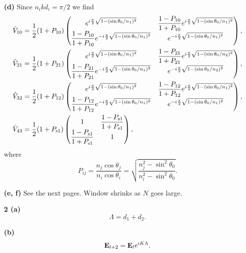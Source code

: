 \documentclass{article}
\makeatletter
\newcommand*{\shifttext}[1]{%
  \settowidth{\@tempdima}{#1}%
  \hspace{-\@tempdima}#1%
}
\newcommand{\plabel}[1]{%
\shifttext{\textbf{#1}\quad}%
}
\newcommand{\prule}{%
\begin{center}%
\hdashrule[0.5ex]{.99\linewidth}{1pt}{1pt 2.5pt}%
\end{center}%
}
\newcommand{\minusbaseline}{\abovedisplayskip=0pt\abovedisplayshortskip=0pt~\vspace*{-\baselineskip}}%
\makeatother
\begin{document}
\plabel{(d)}%
Since $n_i k d_i = \pi/2$ we find
\begin{align*}
    \hat{V}_{10} &= \frac{1}{2}\qty(1+P_{10}) \begin{pmatrix}
        e^{i\frac{\pi}{2}\sqrt{1-(\sin\theta_0/n_1)^2}} & \dfrac{1-P_{10}}{1+P_{10}} e^{i\frac{\pi}{2}\sqrt{1-(\sin\theta_0/n_1)^2}}
        \\
        \dfrac{1-P_{10}}{1+P_{10}} e^{-i\frac{\pi}{2}\sqrt{1-(\sin\theta_0/n_1)^2}} & e^{-i\frac{\pi}{2}\sqrt{1-(\sin\theta_0/n_1)^2}}
    \end{pmatrix}, \\
    \hat{V}_{21} &= \frac{1}{2}\qty(1+P_{21}) \begin{pmatrix}
        e^{i\frac{\pi}{2}\sqrt{1-(\sin\theta_0/n_1)^2}} & \dfrac{1-P_{21}}{1+P_{21}} e^{i\frac{\pi}{2}\sqrt{1-(\sin\theta_0/n_2)^2}}
        \\
        \dfrac{1-P_{21}}{1+P_{21}} e^{-i\frac{\pi}{2}\sqrt{1-(\sin\theta_0/n_1)^2}} & e^{-i\frac{\pi}{2}\sqrt{1-(\sin\theta_0/n_2)^2}}
    \end{pmatrix}, \\
    \hat{V}_{32} &= \frac{1}{2}\qty(1+P_{12}) \begin{pmatrix}
        e^{i\frac{\pi}{2}\sqrt{1-(\sin\theta_0/n_1)^2}} & \dfrac{1-P_{12}}{1+P_{12}} e^{i\frac{\pi}{2}\sqrt{1-(\sin\theta_0/n_1)^2}}
        \\
        \dfrac{1-P_{12}}{1+P_{12}} e^{-i\frac{\pi}{2}\sqrt{1-(\sin\theta_0/n_1)^2}} & e^{-i\frac{\pi}{2}\sqrt{1-(\sin\theta_0/n_1)^2}}
    \end{pmatrix}, \\
    \hat{V}_{43} &= \frac{1}{2}\qty(1+P_{\mathrm{s}1}) \begin{pmatrix}
        1 & \dfrac{1-P_{\mathrm{s}1}}{1+P_{\mathrm{s}1}}
        \\
        \dfrac{1-P_{\mathrm{s}1}}{1+P_{\mathrm{s}1}} & 1
    \end{pmatrix},
\end{align*}
where
\[ P_{ij} = \frac{n_j \cos\theta_j}{n_i \cos\theta_i} = \sqrt{\frac{n_j^2 - \sin^2\theta_0}{n_i^2 - \sin^2\theta_0}}. \]

\plabel{(e, f)}%
See the next pages. Window shrinks as $N$ goes large.

\prule



\plabel{2 (a)}%
\begingroup\minusbaseline%
\[ \Lambda = d_1 + d_2. \]
\endgroup

\plabel{(b)}%
\begingroup\minusbaseline%
\[ \vb{E}_{l+2} = \vb{E}_l e^{iK\Lambda}. \]
\endgroup
\end{document}
